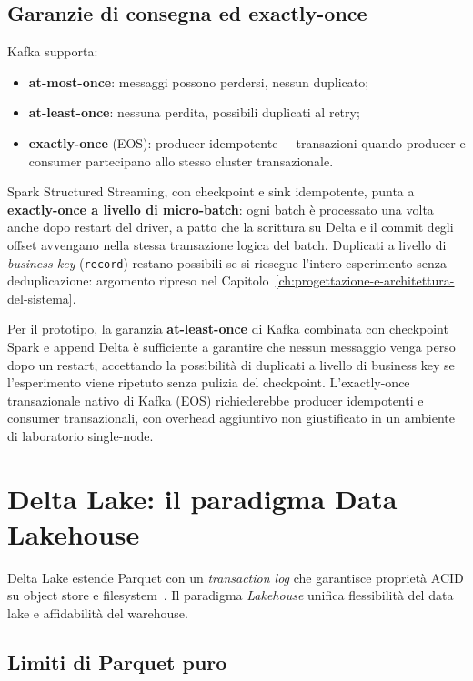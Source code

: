 \subsection{Garanzie di consegna ed exactly-once}

Kafka supporta:
\begin{itemize}
  \item \textbf{at-most-once}: messaggi possono perdersi, nessun duplicato;
  \item \textbf{at-least-once}: nessuna perdita, possibili duplicati al retry;
  \item \textbf{exactly-once} (EOS): producer idempotente + transazioni quando producer e consumer partecipano allo stesso cluster transazionale.
\end{itemize}

Spark Structured Streaming, con checkpoint e sink idempotente, punta a \textbf{exactly-once a livello di micro-batch}: ogni batch è processato una volta anche dopo restart del driver, a patto che la scrittura su Delta e il commit degli offset avvengano nella stessa transazione logica del batch.
Duplicati a livello di \emph{business key} (\texttt{record}) restano possibili se si riesegue l'intero esperimento senza deduplicazione: argomento ripreso nel Capitolo~\ref{ch:progettazione-e-architettura-del-sistema}.

Per il prototipo, la garanzia \textbf{at-least-once} di Kafka combinata con checkpoint Spark e append Delta è sufficiente a garantire che nessun messaggio venga perso dopo un restart, accettando la possibilità di duplicati a livello di business key se l'esperimento viene ripetuto senza pulizia del checkpoint.
L'exactly-once transazionale nativo di Kafka (EOS) richiederebbe producer idempotenti e consumer transazionali, con overhead aggiuntivo non giustificato in un ambiente di laboratorio single-node.

\section{Delta Lake: il paradigma Data Lakehouse}\label{sec:delta-lake}

Delta Lake estende Parquet con un \emph{transaction log} che garantisce proprietà ACID su object store e filesystem~\cite{armbrust2020delta}.
Il paradigma \emph{Lakehouse} unifica flessibilità del data lake e affidabilità del warehouse.

\subsection{Limiti di Parquet puro}

